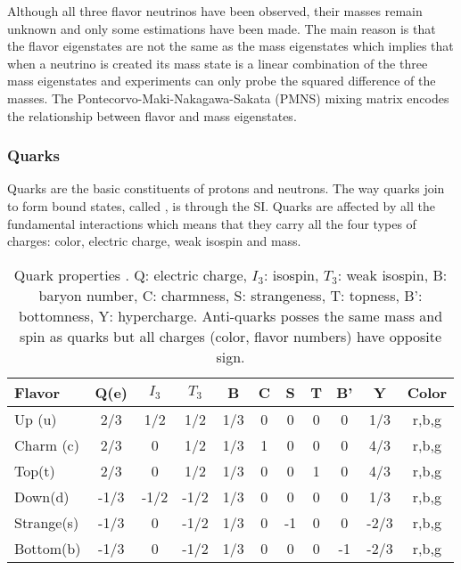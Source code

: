 Although all three flavor neutrinos have been observed, their masses remain unknown and only some estimations have been made\cite{nu_mass}. The main reason is that the flavor eigenstates are not the same as the mass eigenstates which implies that when a neutrino is created its mass state is a linear combination of the three mass eigenstates and experiments can only probe the squared difference of the masses. The Pontecorvo-Maki-Nakagawa-Sakata (PMNS) mixing matrix encodes the relationship between flavor and mass eigenstates.

\subsubsection*{Quarks}

Quarks are the basic constituents of protons and neutrons. The way quarks join to form bound states, called , is through the SI. Quarks are affected by all the fundamental interactions which means that they carry all the four types of charges: color, electric charge, weak isospin and mass.


\begin{table}[h!]
\centering
\footnotesize
\begin{tabular}{lcccccccccc} \hline
Flavor     & Q(e) & $I_3$ & $T_3$  & B   & C & S  & T & B'  & Y    & Color \\ \hline
Up (u)     & 2/3  & 1/2   &  1/2   & 1/3 & 0 & 0  & 0 & 0   & 1/3  & r,b,g \\ %
Charm (c)  & 2/3  & 0     &  1/2   & 1/3 & 1 & 0  & 0 & 0   & 4/3  & r,b,g \\ %
Top(t)     & 2/3  & 0     &  1/2   & 1/3 & 0 & 0  & 1 & 0   & 4/3  & r,b,g \\ \hline
Down(d)    & -1/3 & -1/2  & -1/2   & 1/3 & 0 & 0  & 0 & 0   & 1/3  & r,b,g \\ %
Strange(s) & -1/3 & 0     & -1/2   & 1/3 & 0 & -1 & 0 & 0   & -2/3 & r,b,g \\ %
Bottom(b)  & -1/3 & 0     & -1/2   & 1/3 & 0 & 0  & 0 & -1  & -2/3 & r,b,g \\ \hline
\end{tabular}
\caption[Quark properties.]{Quark properties \cite{pdg}. Q: electric charge, $I_3$: isospin, $T_3$: weak isospin, B: baryon number, C: charmness, S: strangeness, T: topness, B': bottomness, Y: hypercharge. Anti-quarks posses the same mass and spin as quarks but all charges (color, flavor numbers) have opposite sign.}\label{quarks}
\end{table}


